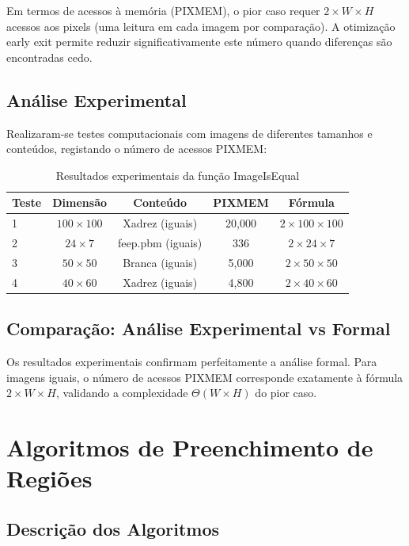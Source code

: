 \documentclass[12pt,a4paper]{article}
\begin{document}
Em termos de acessos à memória (PIXMEM), o pior caso requer $2 \times W \times H$ acessos aos pixels (uma leitura em cada imagem por comparação). A otimização early exit permite reduzir significativamente este número quando diferenças são encontradas cedo.

\subsection{Análise Experimental}

Realizaram-se testes computacionais com imagens de diferentes tamanhos e conteúdos, registando o número de acessos PIXMEM:

\begin{table}[h]
\centering
\begin{tabular}{|l|c|c|c|c|}
\hline
\textbf{Teste} & \textbf{Dimensão} & \textbf{Conteúdo} & \textbf{PIXMEM} & \textbf{Fórmula} \\
\hline
1 & $100 \times 100$ & Xadrez (iguais) & 20,000 & $2 \times 100 \times 100$ \\
\hline

2 & $24 \times 7$ & feep.pbm (iguais) & 336 & $2 \times 24 \times 7$ \\
\hline
3 & $50 \times 50$ & Branca (iguais) & 5,000 & $2 \times 50 \times 50$ \\
\hline
4 & $40 \times 60$ & Xadrez (iguais) & 4,800 & $2 \times 40 \times 60$ \\
\hline
\end{tabular}
\caption{Resultados experimentais da função ImageIsEqual}
\end{table}

\subsection{Comparação: Análise Experimental vs Formal}

Os resultados experimentais confirmam perfeitamente a análise formal. Para imagens iguais, o número de acessos PIXMEM corresponde exatamente à fórmula $2 \times W \times H$, validando a complexidade $\Theta(W \times H)$ do pior caso.
\newpage
\section{Algoritmos de Preenchimento de Regiões}

\subsection{Descrição dos Algoritmos}
\end{document}
